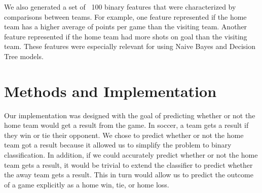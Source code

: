 We also generated a set of ~100 binary features that were characterized by comparisons between teams. For example, one feature represented if the home team has a higher average of points per game than the visiting team. Another feature represented if the home team had more shots on goal than the visiting team. These features were especially relevant for using Naive Bayes and Decision Tree models.

\section{Methods and Implementation}
Our implementation was designed with the goal of predicting whether or not the home team would get a result from the game. In soccer, a team gets a result if they win or tie their opponent. We chose to predict whether or not the home team got a result because it allowed us to simplify the problem to binary classification. In addition, if we could accurately predict whether or not the home team gets a result, it would be trivial to extend the classifier to predict whether the away team gets a result. This in turn would allow us to predict the outcome of a game explicitly as a home win, tie, or home loss.

